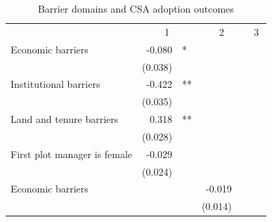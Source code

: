 \begin{table}[!h]
\caption{Barrier domains and CSA adoption outcomes}
\centering
\begin{tabular}{lllllll}
\cline{1-7}
\multicolumn{1}{r}{} &
  \multicolumn{2}{c}{1} &
  \multicolumn{2}{c}{2} &
  \multicolumn{2}{c}{3} \\
\cline{1-7}
\multicolumn{1}{l}{Economic barriers} &
  \multicolumn{1}{r}{-0.080} &
  \multicolumn{1}{l}{*} &
  \multicolumn{1}{r}{} &
  \multicolumn{1}{l}{} &
  \multicolumn{1}{r}{} &
  \multicolumn{1}{l}{} \\
\multicolumn{1}{l}{} &
  \multicolumn{1}{r}{(0.038)} &
  \multicolumn{1}{l}{} &
  \multicolumn{1}{r}{} &
  \multicolumn{1}{l}{} &
  \multicolumn{1}{r}{} &
  \multicolumn{1}{l}{} \\
\multicolumn{1}{l}{Institutional barriers} &
  \multicolumn{1}{r}{-0.422} &
  \multicolumn{1}{l}{**} &
  \multicolumn{1}{r}{} &
  \multicolumn{1}{l}{} &
  \multicolumn{1}{r}{} &
  \multicolumn{1}{l}{} \\
\multicolumn{1}{l}{} &
  \multicolumn{1}{r}{(0.035)} &
  \multicolumn{1}{l}{} &
  \multicolumn{1}{r}{} &
  \multicolumn{1}{l}{} &
  \multicolumn{1}{r}{} &
  \multicolumn{1}{l}{} \\
\multicolumn{1}{l}{Land and tenure barriers} &
  \multicolumn{1}{r}{0.318} &
  \multicolumn{1}{l}{**} &
  \multicolumn{1}{r}{} &
  \multicolumn{1}{l}{} &
  \multicolumn{1}{r}{} &
  \multicolumn{1}{l}{} \\
\multicolumn{1}{l}{} &
  \multicolumn{1}{r}{(0.028)} &
  \multicolumn{1}{l}{} &
  \multicolumn{1}{r}{} &
  \multicolumn{1}{l}{} &
  \multicolumn{1}{r}{} &
  \multicolumn{1}{l}{} \\
\multicolumn{1}{l}{First plot manager is female} &
  \multicolumn{1}{r}{-0.029} &
  \multicolumn{1}{l}{} &
  \multicolumn{1}{r}{} &
  \multicolumn{1}{l}{} &
  \multicolumn{1}{r}{} &
  \multicolumn{1}{l}{} \\
\multicolumn{1}{l}{} &
  \multicolumn{1}{r}{(0.024)} &
  \multicolumn{1}{l}{} &
  \multicolumn{1}{r}{} &
  \multicolumn{1}{l}{} &
  \multicolumn{1}{r}{} &
  \multicolumn{1}{l}{} \\
\multicolumn{1}{l}{Economic barriers} &
  \multicolumn{1}{r}{} &
  \multicolumn{1}{l}{} &
  \multicolumn{1}{r}{-0.019} &
  \multicolumn{1}{l}{} &
  \multicolumn{1}{r}{} &
  \multicolumn{1}{l}{} \\
\multicolumn{1}{l}{} &
  \multicolumn{1}{r}{} &
  \multicolumn{1}{l}{} &
  \multicolumn{1}{r}{(0.014)} &
  \multicolumn{1}{l}{} &
  \multicolumn{1}{r}{} &

\end{tabular}
\end{table}
